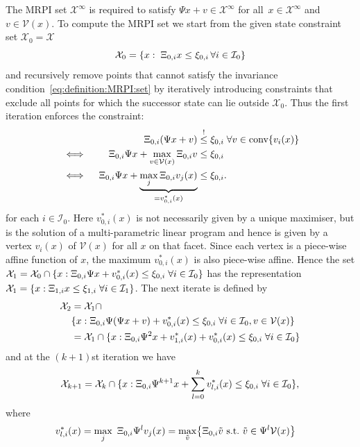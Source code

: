 \documentclass[journal]{IEEEtran}
\providecommand{\conv}{\text{conv}}
\theoremstyle{remark}
\theoremstyle{definition}
\begin{document}
The MRPI set $\mathcal X^\infty$ is required to satisfy $\Psi x + 
v\in\mathcal X^\infty$ for all~$x\in\mathcal X^\infty$ and $v\in\mathcal V(x)$. 
%
To compute the MRPI set we start from the given state constraint set $\mathcal X_0=\mathcal X$
%
\[
\mathcal X_0 = \{x:\;\Xi_{0,i}x\leq \xi_{0,i}\,\forall i\in\mathcal I_0\}
\]
%
and recursively remove points that cannot satisfy the invariance condition~\eqref{eq:definition:MRPI:set}
by iteratively introducing constraints that exclude all points for which the successor state can lie outside 
$\mathcal X_0$. 
%
Thus the first iteration enforces the constraint:
%
\begin{alignat*}{3}
&  &\genmat_{0,i}(\Psi x + v) & \overset{!}{\leq}\genvec_{0,i}\;\forall v\in\conv\{v_i(x)\}\\
&\iff  &\genmat_{0,i}\Psi x + \max_{v\in\mathcal V(x)} \genmat_{0,i} v & \leq \genvec_{0,i}\\
&\iff\;  &\genmat_{0,i}\Psi x + \underbrace{\max_{j} \genmat_{0,i} v_j(x)}_{=v_{0,i}^\ast(x)} &\leq \genvec_{0,i}.
\end{alignat*}
%
for each $i\in \mathcal I_0$.
%
Here $v_{0,i}^\ast(x)$ is not necessarily given by a unique maximiser, but is the solution of a multi-parametric 
linear program and hence is given by a vertex $v_i(x)$ of $\mathcal V(x)$ for all $x$ on that facet.
%
Since each vertex is a piece-wise affine function of $x$, the maximum $v_{0,i}^\ast(x)$ is also piece-wise affine.
Hence the set $\mathcal X_1=\mathcal X_0 \cap \{x:\Xi_{0,i}\Psi x + v_{0,i}^\ast(x) \leq 
\xi_{0,i}\;\forall i\in\mathcal I_0\}$
has the representation $\mathcal X_1 = \{x:\Xi_{1,i}x\leq\xi_{1,i}\;\forall i\in\mathcal I_1\}$.
%
The next iterate is defined by
%
\begin{align*}
  \mathcal X_2 &= \mathcal X_1 \cap \\ &\{x:\Xi_{0,i}\Psi(\Psi x + v) + v_{0,i}^\ast(x)\leq\xi_{0,i}\;
  \forall i\in\mathcal I_0,v\in\mathcal V(x)\}\\
  &= \mathcal X_1 \cap \{x: \Xi_{0,i}\Psi^2 x + v_{1,i}^\ast(x) + v_{0,i}^\ast(x)\leq\xi_{0,i}\;\forall 
  i\in\mathcal I_0\}
\end{align*}
%
and at the $(k+1)$st iteration we have
%
\[
\mathcal X_{k+1} = \mathcal X_{k}\cap \{x:\Xi_{0,i}\Psi^{k+1} x + \sum_{l=0}^{k}v_{l,i}^\ast(x)
  \leq\xi_{0,i}\;\forall i\in\mathcal I_0\},
\]
%
where 
%
\begin{align*}
v_{l,i}^\ast(x) &= \max_j \ \genmat_{0,i}\Psi^{l}v_j(x)  = \max_{\tilde v} \bigl\{ 
\genmat_{0,i}\tilde v
\ \text{s.t.}\ 
\tilde v\in  \Psi^{l}\mathcal V(x) \bigr\}
\end{align*}
\end{document}
